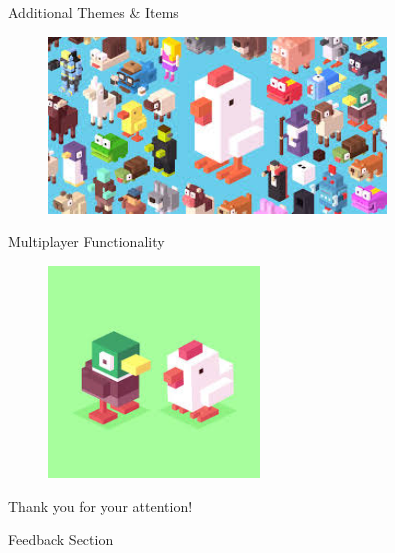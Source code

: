 \documentclass[13.5pt,aspecratio=169, xcolor=dvipsnames]{beamer}
\begin{document}
\begin{frame}
    
         {
            \begin{minipage}{0.4\textwidth}
                \begin{block}{}
                    \centering
                    Additional Themes \& Items
                \end{block}
            \end{minipage}
    
            \begin{figure}[h]
                \centering
                \includegraphics[width=0.8\textwidth]{multi_theme.jpg}
            \end{figure}
        }
    
         {
            \begin{minipage}{0.4\textwidth}
                \begin{block}{}
                    \centering
                    Multiplayer Functionality
                \end{block}
            \end{minipage}
    
            \begin{figure}[h]
                \centering
                \includegraphics[width=0.5\textwidth]{Multiplayer.jpg}
            \end{figure}
        }
    \end{frame}
    
    \begin{frame}
        \begin{center}
            {\Huge Thank you for your attention!}
            
            \bigskip\bigskip %
            
            {\LARGE Feedback Section}
        \end{center}
    \end{frame}
    
\end{document}
